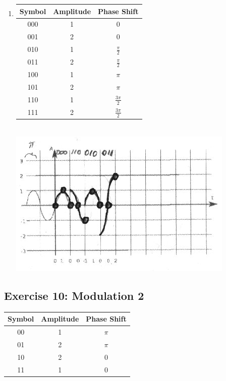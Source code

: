 \documentclass[10pt,a4paper]{scrartcl}
\begin{document}
\begin{enumerate}
\item
\begin{tabular}{|c|c|c|}
\hline Symbol & Amplitude & Phase Shift\\ 
\hline 000 & 1 & $0$ \\ 
\hline 001 & 2 & $0$ \\ 
\hline 010 & 1 & $\frac{\pi}{2}$ \\ 
\hline 011 & 2 & $\frac{\pi}{2}$ \\ 
\hline 100 & 1 & $\pi$ \\ 
\hline 101 & 2 & $\pi$ \\ 
\hline 110 & 1 & $\frac{3\pi}{2}$ \\ 
\hline 111 & 2 & $\frac{3\pi}{2}$ \\ 
\hline 
\end{tabular} \\
\includegraphics[scale=2]{a3e9_2.jpg}
\end{enumerate}

\subsection*{Exercise 10: Modulation 2}
\begin{tabular}{|c|c|c|}
\hline Symbol & Amplitude & Phase Shift \\ 
\hline 00 & 1 & $\pi$ \\ 
\hline 01 & 2 & $\pi$ \\ 
\hline 10 & 2 & 0 \\ 
\hline 11 & 1 & 0 \\ 
\hline 
\end{tabular} 
\end{document}

